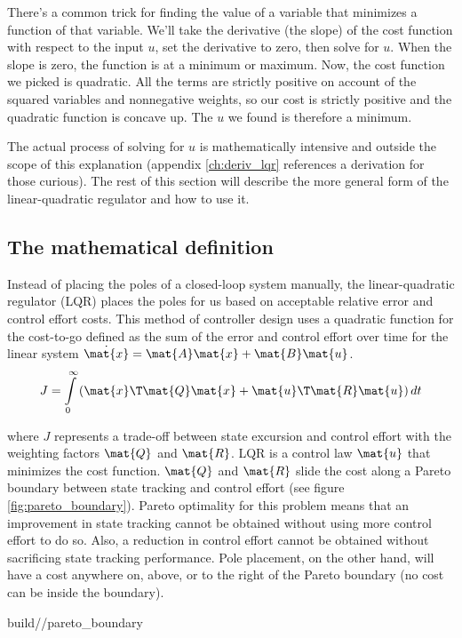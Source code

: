 There's a common trick for finding the value of a variable that minimizes a
function of that variable. We'll take the derivative (the slope) of the cost
function with respect to the input $u$, set the derivative to zero, then solve
for $u$. When the slope is zero, the function is at a minimum or maximum. Now,
the cost function we picked is quadratic. All the terms are strictly positive on
account of the squared variables and nonnegative weights, so our cost is
strictly positive and the quadratic function is concave up. The $u$ we found is
therefore a minimum.

The actual process of solving for $u$ is mathematically intensive and outside
the scope of this explanation (appendix \ref{ch:deriv_lqr} references a
derivation for those curious). The rest of this section will describe the more
general form of the linear-quadratic regulator and how to use it.

\subsection{The mathematical definition}

Instead of placing the poles of a closed-loop \gls{system} manually, the
linear-quadratic regulator (LQR) places the poles for us based on acceptable
relative \gls{error} and \gls{control effort} costs. This method of controller
design uses a quadratic function for the cost-to-go defined as the sum of the
\gls{error} and \gls{control effort} over time for the linear \gls{system}
$\dot{\mat{x}} = \mat{A}\mat{x} + \mat{B}\mat{u}$.
\begin{equation*}
  J = \int\limits_0^\infty \left(\mat{x}\T\mat{Q}\mat{x} +
    \mat{u}\T\mat{R}\mat{u}\right) dt
\end{equation*}

where $J$ represents a trade-off between \gls{state} excursion and
\gls{control effort} with the weighting factors $\mat{Q}$ and $\mat{R}$. LQR is
a \gls{control law} $\mat{u}$ that minimizes the cost function. $\mat{Q}$ and
$\mat{R}$ slide the cost along a Pareto boundary between state tracking and
\gls{control effort} (see figure \ref{fig:pareto_boundary}). Pareto optimality
for this problem means that an improvement in state \gls{tracking} cannot be
obtained without using more \gls{control effort} to do so. Also, a reduction in
\gls{control effort} cannot be obtained without sacrificing state \gls{tracking}
performance. Pole placement, on the other hand, will have a cost anywhere on,
above, or to the right of the Pareto boundary (no cost can be inside the
boundary).
\begin{svg}{build/\chapterpath/pareto_boundary}
  \caption{Pareto boundary for LQR}
  \label{fig:pareto_boundary}
\end{svg}


